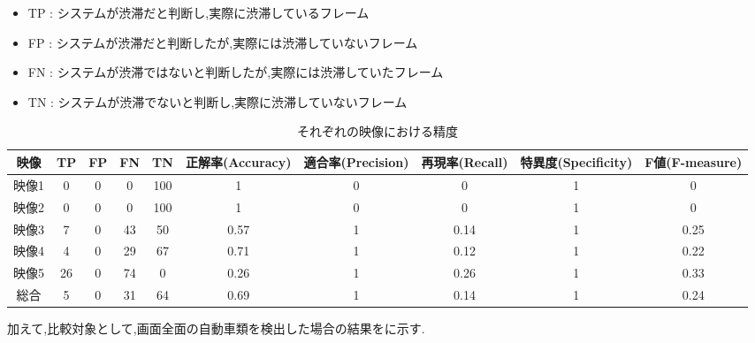 \begin{itemize}
  \item TP : システムが渋滞だと判断し,実際に渋滞しているフレーム
  \item FP : システムが渋滞だと判断したが,実際には渋滞していないフレーム
  \item FN : システムが渋滞ではないと判断したが,実際には渋滞していたフレーム
  \item TN : システムが渋滞でないと判断し,実際に渋滞していないフレーム
\end{itemize}
\begin{table}[htbp]
  \centering
  \begin{scriptsize}
  \begin{tabular}{cccccccccc}
  \toprule
映像 & TP & FP & FN & TN & 正解率(Accuracy) & 適合率(Precision) & 再現率(Recall) & 特異度(Specificity) & F値(F-measure) \\
  \midrule
映像1 & 0 & 0 & 0 & 100 & 1 & 0 & 0 & 1 & 0 \\
映像2 & 0 & 0 & 0 & 100 & 1 & 0 & 0 & 1 & 0 \\
映像3 & 7 & 0 & 43 & 50 & 0.57 & 1 & 0.14 & 1 & 0.25 \\
映像4 & 4 & 0 & 29 & 67 & 0.71 & 1 & 0.12 & 1 & 0.22 \\
映像5 & 26 & 0 & 74 & 0 & 0.26 & 1 & 0.26 & 1 & 0.33 \\
総合 & 5 & 0 & 31 & 64 & 0.69 & 1 & 0.14 & 1 & 0.24 \\
\bottomrule
\end{tabular}
\end{scriptsize}
  \caption{それぞれの映像における精度}
  \label{tab:mAP_fig}
\end{table}

加えて,比較対象として,画面全面の自動車類を検出した場合の結果をに示す.


